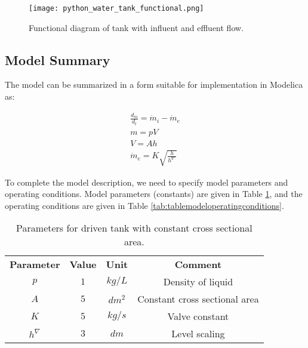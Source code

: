 \begin{figure} [!h] 
	\centering
	\texttt{[image: python\_water\_tank\_functional.png]}
	\caption{Functional diagram of tank with influent and effluent flow.}
	\label{fig:pythonwatertankfunctional}
\end{figure}

\subsection{Model Summary}
\label{subsec:pythonmodelsummary}

The model can be summarized in a form suitable for implementation in Modelica as:

\clearpage
\begin{equation*} 
	\begin{aligned}
	    \frac{d_m}{d_t} = \dot{m}_i - \dot{m}_e \\
	     m = pV \\
	     V = Ah \\
	     \dot{m}_e = K\sqrt{\frac{h}{h^{\nabla^.}}} 
	\end{aligned}
\end{equation*}

To complete the model description, we need to specify model parameters and operating conditions. Model parameters
(constants) are given in Table \ref{tab:tablemodelparameters}, and the operating conditions are given in Table \ref{tab:tablemodeloperatingconditions}.

\begin{table} [!h]
	\begin{center}
		\caption{Parameters for driven tank with constant cross sectional area.} 
		\label{tab:tablemodelparameters} 
		\begin{tabular}{ cccc } 
			\hline
			\bfseries Parameter & \bfseries Value  & \bfseries Unit  & \bfseries Comment \\ 
			$p$ & $1$ & $kg/L $ & Density of liquid \\ 
			$A$ & $5$ & $dm^2$ & Constant cross sectional area \\ 
			$K$ & $5$ & $kg/s$ & Valve constant \\
			$h^{\nabla}$ & $3$ & $dm$ & Level scaling \\  
			\hline
		\end{tabular}
	\end{center}
\end{table}

